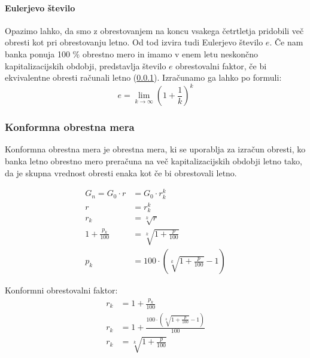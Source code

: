 \documentclass[12pt]{article}
\begin{document}
        \paragraph{Eulerjevo število}
            \label{euler}
            Opazimo lahko, da smo z obrestovanjem na koncu vsakega četrtletja pridobili več obresti
            kot pri obrestovanju letno. Od tod izvira tudi Eulerjevo število $e$. Če nam 
            banka ponuja 100 \% obrestno mero in imamo v enem letu neskončno kapitalizacijskih 
            obdobji, predstavlja število $e$ obrestovalni faktor, če bi ekvivalentne obresti 
            računali letno (\ref{konformna}). Izračunamo ga lahko po formuli: \hfill \cite{wiki:euler}
            \begin{equation}
                e = \lim_{k \to \infty} (1 + \frac{1}{k})^k
            \end{equation}

        \subsubsection{Konformna obrestna mera}
        \label{konformna}
        Konformna obrestna mera je obrestna mera, ki se uporablja za izračun obresti, ko
        banka letno obrestno mero preračuna na več kapitalizacijskih obdobji letno tako, da
        je skupna vrednost obresti enaka kot če bi obrestovali letno.
        
        \begin{equation}
            \begin{split}
                G_n = G_0 \cdot r & = G_0 \cdot r_k^k \\
                r & = r_k^k \\
                r_k & = \sqrt[k]{r} \\
                1 + \frac{p_k}{100} & = \sqrt[k]{1 + \frac{p}{100}} \\
                p_k & = 100 \cdot (\sqrt[k]{1 + \frac{p}{100}} - 1)
            \end{split}
        \end{equation}

        Konformni obrestovalni faktor:
        \begin{equation}
            \begin{split}
                r_k & = 1 + \frac{p_k}{100} \\
                r_k & = 1 + \frac{100 \cdot (\sqrt[k]{1 + \frac{p}{100}} - 1)}{100} \\
                r_k & = \sqrt[k]{1 + \frac{p}{100}}
            \end{split}
        \end{equation}
\end{document}
